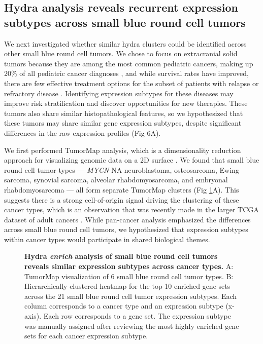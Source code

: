\documentclass[10pt,letterpaper]{article}
\begin{document}
\subsection*{Hydra analysis reveals recurrent expression subtypes across small blue round cell tumors}
We next investigated whether similar hydra clusters could be identified across other small blue round cell tumors. We chose to focus on extracranial solid tumors because they are among the most common pediatric cancers, making up 20\% of all pediatric cancer diagnoses \cite{riesCancerIncidenceSurvival1999}, and while survival rates have improved, there are few effective treatment options for the subset of patients with relapse or refractory disease \cite{ringCheckpointProteinsPediatric2017}. Identifying expression subtypes for these diseases may improve risk stratification and discover opportunities for new therapies. These tumors also share similar histopathological features, so we hypothesized that these tumors may share similar gene expression subtypes, despite significant differences in the raw expression profiles (Fig 6A).  

We first performed TumorMap analysis, which is a dimensionality reduction approach for visualizing genomic data on a 2D surface \cite{newtonTumorMapExploringMolecular2017}. We found that small blue round cell tumor types --- \textit{MYCN}-NA neuroblastoma, osteosarcoma, Ewing sarcoma, synovial sarcoma, alveolar rhabdomyosarcoma, and embryonal rhabdomyosarcoma --- all form separate TumorMap clusters (Fig \ref{pancan}A). This suggests there is a strong cell-of-origin signal driving the clustering of these cancer types, which is an observation that was recently made in the larger TCGA dataset of adult cancers \cite{hoadleyCellofOriginPatternsDominate2018}. While pan-cancer analysis emphasized the differences across small blue round cell tumors, we hypothesized that expression subtypes within cancer types would participate in shared biological themes.

\begin{figure}[!h]
	\caption{{\bf Hydra \textit{enrich} analysis of small blue round cell tumors reveals similar expression subtypes across cancer types.} A: TumorMap visualization of 6 small blue round cell tumor types. B: Hierarchically clustered heatmap for the top 10 enriched gene sets across the 21 small blue round cell tumor expression subtypes. Each column corresponds to a cancer type and an expression subtype (x-axis). Each row corresponds to a gene set. The expression subtype was manually assigned after reviewing the most highly enriched gene sets for each cancer expression subtype.}
	\label{pancan}
\end{figure}
\end{document}
